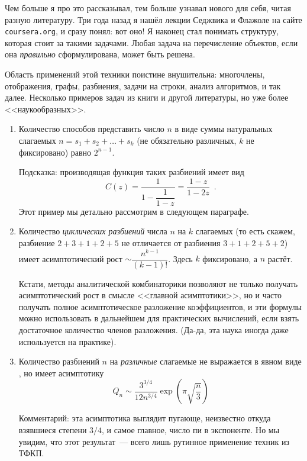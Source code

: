 \documentclass{article}
\theoremstyle{definition}
\begin{document}
Чем больше я про это рассказывал, тем больше узнавал нового для себя, читая 
разную литературу. Три года назад я нашёл лекции Седжвика и Флажоле \cite{ac} 
на сайте \texttt{coursera.org}, и сразу понял: вот оно! Я наконец стал понимать 
структуру, которая стоит за такими задачами. Любая задача на перечисление 
объектов, если она \textit{правильно} сформулирована, может быть решена.

Область применений этой техники поистине внушительна: многочлены, отображения, 
графы, разбиения, задачи на строки, анализ алгоритмов, и так далее. Несколько 
примеров задач из книги \cite{ac} и другой литературы, но уже более 
<<наукообразных>>.

\begin{enumerate}
	\item Количество способов представить число \( n \) в виде суммы 
	натуральных слагаемых \( n = s_1 + s_2 + \ldots + s_k \) (не обязательно 
	различных, \( k \) не фиксировано) равно \( 2^{n-1} \).
	
	Подсказка: производящая функция таких разбиений имеет вид
	\[
		C(z) = \dfrac{1}{1 - \dfrac{1}{1-z}} = \dfrac{1-z}{1 - 2z}
		\enspace .
	\]
	Этот пример мы детально рассмотрим в следующем параграфе.
	\item Количество \textit{циклических разбиений} числа \( n \) на \( k \) 
	слагаемых (то есть скажем, разбиение \( 2 + 3 + 1 + 2 + 5 \) не отличается 
	от разбиения \( 3 + 1 + 2 + 5 + 2 \)) имеет асимптотический рост \( \sim 
	\dfrac{n^{k-1}}{(k-1)!} \). Здесь \( k \) фиксировано, а \( n \)  растёт.
	
	Кстати, методы аналитической комбинаторики позволяют не только получать 
	асимптотический рост в смысле <<главной асимптотики>>, но и часто получать 
	полное 
	асимптотическое разложение коэффициентов, и эти формулы можно использовать 
	в дальнейшем для практических вычислений, если взять достаточное количество 
	членов разложения. (Да-да, эта наука иногда даже используется на практике).
	\item Количество разбиений \( n \) на \textit{различные} слагаемые не 
	выражается в явном виде \cite[section VIII.6, p.574]{ac}, но имеет 
	асимптотику
	\[
		Q_n \sim \dfrac{3^{3/4}}{12 n^{3/4}} \exp \left( \pi \sqrt{\dfrac n 3} 
		\right)
	\]
	
	Комментарий: эта асимптотика выглядит пугающе, неизвестно откуда взявшиеся 
	степени \( 3/4 \), и самое главное, число пи в экспоненте. Но мы увидим, 
	что этот результат~--- всего лишь рутинное применение техник из ТФКП.
	

\end{enumerate}
\end{document}
